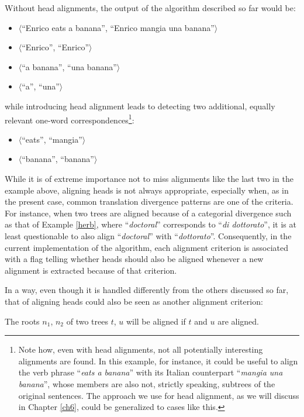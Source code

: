 \begin{example}
 Without head alignments, the output of the algorithm described so far would be:
 \begin{itemize}
 \item $\langle$``Enrico eats a banana'', ``Enrico mangia una banana''$\rangle$
 \item $\langle$``Enrico'', ``Enrico''$\rangle$
 \item $\langle$``a banana'', ``una banana''$\rangle$
 \item $\langle$``a'', ``una''$\rangle$
 \end{itemize} 
 while introducing head alignment leads to detecting two additional, equally relevant one-word correspondences\footnote{Note how, even with head alignments, not all potentially interesting alignments are found. In this example, for instance, it could be useful to align the verb phrase ``\textit{eats a banana}'' with its Italian counterpart ``\textit{mangia una banana}'', whose members are also not, strictly speaking, subtrees of the original sentences. The approach we use for head alignment, as we will discuss in Chapter \ref{ch6}, could be generalized to cases like this.}:
 \begin{itemize}
 \item $\langle$``eats'', ``mangia''$\rangle$
 \item $\langle$``banana'', ``banana''$\rangle$
 \end{itemize} 
\end{example}

While it is of extreme importance not to miss alignments like the last two in the example above, aligning heads is not always appropriate, especially when, as in the present case, common translation divergence patterns are one of the criteria. For instance, when two trees are aligned because of a categorial divergence such as that of Example \ref{herb}, where ``\textit{doctoral}'' corresponds to ``\textit{di dottorato}'', it is at least questionable to also align ``\textit{doctoral}'' with ``\textit{dottorato}''. Consequently, in the current implementation of the algorithm, each alignment criterion is associated with a flag telling whether heads should also be aligned whenever a new alignment is extracted because of that criterion. \smallskip

In a way, even though it is handled differently from the others discussed so far, that of aligning heads could also be seen as another alignment criterion: \smallskip

\begin{criterion} \label{cheads}
 The roots $n_1$, $n_2$ of two trees $t$, $u$ will be aligned if $t$ and $u$ are aligned.
\end{criterion}

